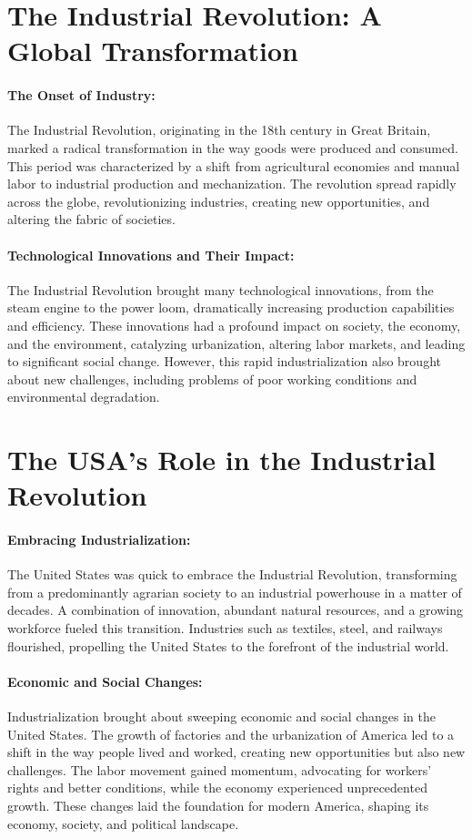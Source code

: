 \documentclass{book}
\begin{document}
\section*{The Industrial Revolution: A Global Transformation}

\paragraph{The Onset of Industry:}
The Industrial Revolution, originating in the 18th century in Great Britain, marked a radical transformation in the way goods were produced and consumed. This period was characterized by a shift from agricultural economies and manual labor to industrial production and mechanization. The revolution spread rapidly across the globe, revolutionizing industries, creating new opportunities, and altering the fabric of societies.

\paragraph{Technological Innovations and Their Impact:}
The Industrial Revolution brought many technological innovations, from the steam engine to the power loom, dramatically increasing production capabilities and efficiency. These innovations had a profound impact on society, the economy, and the environment, catalyzing urbanization, altering labor markets, and leading to significant social change. However, this rapid industrialization also brought about new challenges, including problems of poor working conditions and environmental degradation.

\section*{The USA’s Role in the Industrial Revolution}

\paragraph{Embracing Industrialization:}
The United States was quick to embrace the Industrial Revolution, transforming from a predominantly agrarian society to an industrial powerhouse in a matter of decades. A combination of innovation, abundant natural resources, and a growing workforce fueled this transition. Industries such as textiles, steel, and railways flourished, propelling the United States to the forefront of the industrial world.

\paragraph{Economic and Social Changes:}
Industrialization brought about sweeping economic and social changes in the United States. The growth of factories and the urbanization of America led to a shift in the way people lived and worked, creating new opportunities but also new challenges. The labor movement gained momentum, advocating for workers’ rights and better conditions, while the economy experienced unprecedented growth. These changes laid the foundation for modern America, shaping its economy, society, and political landscape.
\end{document}
